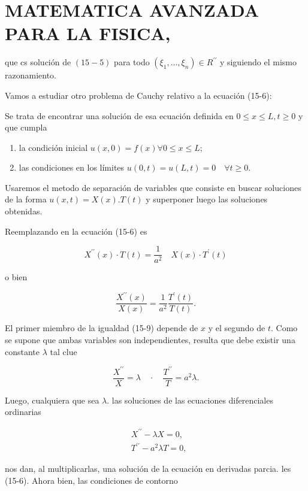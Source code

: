 \documentclass[10pt]{article}
\theoremstyle{plain}
\theoremstyle{definition}
\theoremstyle{remark}
\begin{document}
\section*{MATEMATICA AVANZADA PARA LA FISICA,}
que cs solución de $(15-5)$ para todo $\left(\xi_{1}, \ldots, \xi_{n}\right) \in R^{\prime \prime}$ y siguiendo el mismo razonamiento.

Vamos a estudiar otro problema de Cauchy relativo a la ecuación (15-6):

Se trata de encontrar una solución de esa ecuación definida en $0 \leqslant x \leqslant L, t \geqslant 0$ y que cumpla

\begin{enumerate}
  \item la condición inicial $u(x, 0)=f(x) \forall 0 \leqslant x \leqslant L$;
  \item las condiciones en los límites $u(0, t)=u(L, t)=0 \quad \forall t \geqslant 0$.
\end{enumerate}

Usaremos el metodo de separación de variables que consiste en buscar soluciones de la forma $u(x, t)=X(x) . T(t)$ y superponer luego las soluciones obtenidas.

Reemplazando en la ecuación (15-6) es

$$
X^{\prime \prime}(x) \cdot T(t)=\frac{1}{a^{2}} \quad X(x) \cdot T^{\prime}(t)
$$

o bien


\begin{equation*}
\frac{X^{\prime \prime}(x)}{X(x)}=\frac{1}{a^{2}} \frac{T^{\prime}(t)}{T(t)} . \tag{15.9}
\end{equation*}


El primer miembro de la igualdad (15-9) depende de $x$ y el segundo de $t$. Como se supone que ambas variables son independientes, resulta que debe existir una constante $\lambda$ tal clue

$$
\frac{X^{\prime \prime}}{X}=\lambda \quad \cdot \quad \frac{T^{\prime \prime}}{T}=a^{2} \lambda .
$$

Luego, cualquiera que sea $\lambda$. las soluciones de las ecuaciones diferenciales ordinarias

$$
\begin{aligned}
& X^{\prime \prime}-\lambda X=0, \\
& T^{\prime \prime}-a^{2} \lambda T=0,
\end{aligned}
$$

nos dan, al multiplicarlas, una solución de la ecuación en derivadas parcia. les (15-6). Ahora bien, las condiciones de contorno
\end{document}
